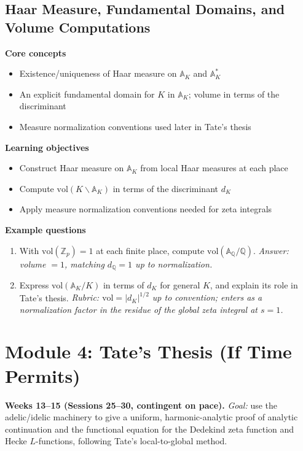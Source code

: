 \documentclass[11pt]{article}
\newcommand{\Q}{\mathbb{Q}}
\newcommand{\A}{\mathbb{A}}
\newcommand{\Zp}{\mathbb{Z}_p}
\begin{document}
\subsection{Haar Measure, Fundamental Domains, and Volume Computations}
\textbf{Core concepts}
\begin{itemize}[noitemsep]
  \item Existence/uniqueness of Haar measure on $\A_K$ and $\A_K^*$
  \item An explicit fundamental domain for $K$ in $\A_K$; volume in terms of the discriminant
  \item Measure normalization conventions used later in Tate's thesis
\end{itemize}
\textbf{Learning objectives}
\begin{itemize}[noitemsep]
  \item Construct Haar measure on $\A_K$ from local Haar measures at each place
  \item Compute $\mathrm{vol}(K\backslash\A_K)$ in terms of the discriminant $d_K$
  \item Apply measure normalization conventions needed for zeta integrals
\end{itemize}
\textbf{Example questions}
\begin{enumerate}[noitemsep]
  \item[Q1 (foundational).] With $\mathrm{vol}(\Zp)=1$ at each finite place, compute $\mathrm{vol}(\A_\Q/\Q)$. \emph{Answer: volume $=1$, matching $d_\Q=1$ up to normalization.}
  \item[Q2 (advanced).] Express $\mathrm{vol}(\A_K/K)$ in terms of $d_K$ for general $K$, and explain its role in Tate's thesis. \emph{Rubric: $\mathrm{vol} = |d_K|^{1/2}$ up to convention; enters as a normalization factor in the residue of the global zeta integral at $s=1$.}
\end{enumerate}

\section{Module 4: Tate's Thesis (If Time Permits)}
\textbf{Weeks 13--15 (Sessions 25--30, contingent on pace).} \textit{Goal:} use the adelic/idelic machinery to give a uniform, harmonic-analytic proof of analytic continuation and the functional equation for the Dedekind zeta function and Hecke $L$-functions, following Tate's local-to-global method.

\end{document}
